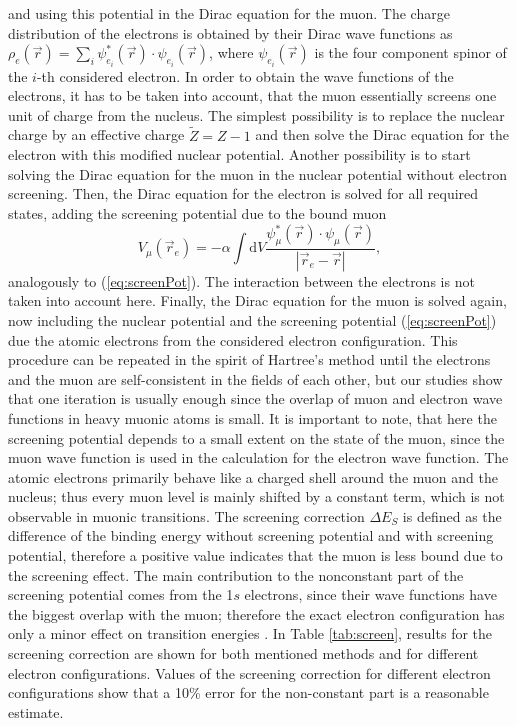 and using this potential in the Dirac equation for the muon. The charge distribution of the electrons is obtained by their Dirac wave functions as $\rho_e (\vec{r})=\sum_i \psi_{e_i}^*(\vec{r})\cdot \psi_{e_i}(\vec{r})$, where $\psi_{e_i}(\vec{r})$  is the four component spinor of the $i$-th considered electron. In order to obtain the wave functions of the electrons, it has to be taken into account, that the muon essentially screens one unit of charge from the nucleus. The simplest possibility is to replace the nuclear charge by an effective charge $\tilde{Z}=Z-1$ and then solve the Dirac equation for the electron with this modified nuclear potential. Another possibility is to start solving the Dirac equation for the muon in the nuclear potential without electron screening. Then, the Dirac equation for the electron is solved for all required states, adding the screening potential due to the bound muon
\begin{equation}
V_{\mu}(\vec{r}_e)=-\alpha \int \mathrm{d}V\frac{\psi_\mu^*(\vec{r})\cdot \psi_\mu(\vec{r})}{|\vec{r}_e-\vec{r}|},
\end{equation}
analogously to (\ref{eq:screenPot}).
The interaction between the electrons is not taken into account here. Finally, the Dirac equation for the muon is solved again, now including the nuclear potential and the screening potential (\ref{eq:screenPot}) due the atomic electrons from the considered electron configuration. This procedure can be repeated in the spirit of Hartree's method \cite{bethe_salpeter} until the electrons and the muon are self-consistent in the fields of each other, but our studies show that one iteration is usually enough since the overlap of muon and electron wave functions in heavy muonic atoms is small. It is important to note, that here the screening potential depends to a small extent on the state of the muon, since the muon wave function is used in the calculation for the electron wave function. The atomic electrons primarily behave like a charged shell around the muon and the nucleus; thus every muon level is mainly shifted by a constant term, which is not observable in muonic transitions. The screening correction $\Delta E_S$ is defined as the difference of the binding energy without screening potential and with screening potential, therefore a positive value indicates that the muon is less bound due to the screening effect. The main contribution to the nonconstant part of the screening potential comes from the 1$s$ electrons, since their wave functions have the biggest overlap with the muon; therefore the exact electron configuration has only a minor effect on transition energies \cite{vogel1973}. In Table \ref{tab:screen}, results for the screening correction are shown for both mentioned methods and for different electron configurations. Values of the screening correction for different electron configurations show that a 10\% error for the non-constant part is a reasonable estimate.
%
%
